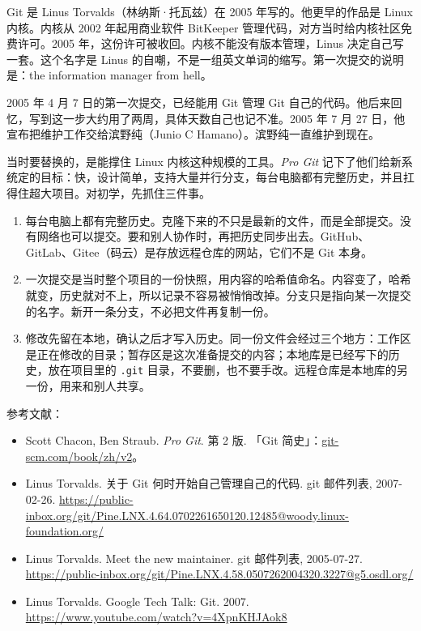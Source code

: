 Git 是 Linus Torvalds（林纳斯·托瓦兹）在 2005 年写的。他更早的作品是 Linux 内核。内核从 2002 年起用商业软件 BitKeeper 管理代码，对方当时给内核社区免费许可。2005 年，这份许可被收回。内核不能没有版本管理，Linus 决定自己写一套。这个名字是 Linus 的自嘲，不是一组英文单词的缩写。第一次提交的说明是：the information manager from hell。

2005 年 4 月 7 日的第一次提交，已经能用 Git 管理 Git 自己的代码。他后来回忆，写到这一步大约用了两周，具体天数自己也记不准。2005 年 7 月 27 日，他宣布把维护工作交给滨野纯（Junio C Hamano）。滨野纯一直维护到现在。

当时要替换的，是能撑住 Linux 内核这种规模的工具。\emph{Pro Git} 记下了他们给新系统定的目标：快，设计简单，支持大量并行分支，每台电脑都有完整历史，并且扛得住超大项目。对初学，先抓住三件事。

\begin{enumerate}
\item 每台电脑上都有完整历史。克隆下来的不只是最新的文件，而是全部提交。没有网络也可以提交。要和别人协作时，再把历史同步出去。GitHub、GitLab、Gitee（码云）是存放远程仓库的网站，它们不是 Git 本身。

\item 一次提交是当时整个项目的一份快照，用内容的哈希值命名。内容变了，哈希就变，历史就对不上，所以记录不容易被悄悄改掉。分支只是指向某一次提交的名字。新开一条分支，不必把文件再复制一份。

\item 修改先留在本地，确认之后才写入历史。同一份文件会经过三个地方：工作区是正在修改的目录；暂存区是这次准备提交的内容；本地库是已经写下的历史，放在项目里的 \verb|.git| 目录，不要删，也不要手改。远程仓库是本地库的另一份，用来和别人共享。
\end{enumerate}

参考文献：
\begin{itemize}
\item Scott Chacon, Ben Straub. \emph{Pro Git}. 第 2 版. 「Git 简史」：\href{https://git-scm.com/book/zh/v2/\%E8\%B5\%B7\%E6\%AD\%A5-Git-\%E7\%AE\%80\%E5\%8F\%B2}{git-scm.com/book/zh/v2}。
\item Linus Torvalds. 关于 Git 何时开始自己管理自己的代码. git 邮件列表, 2007-02-26. \url{https://public-inbox.org/git/Pine.LNX.4.64.0702261650120.12485@woody.linux-foundation.org/}
\item Linus Torvalds. Meet the new maintainer. git 邮件列表, 2005-07-27. \url{https://public-inbox.org/git/Pine.LNX.4.58.0507262004320.3227@g5.osdl.org/}
\item Linus Torvalds. Google Tech Talk: Git. 2007. \url{https://www.youtube.com/watch?v=4XpnKHJAok8}
\end{itemize}


